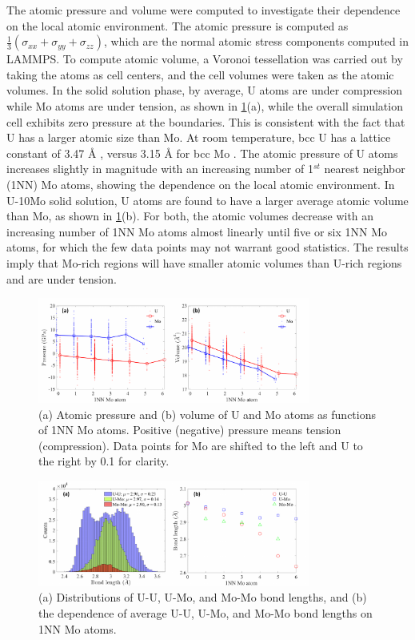 \documentclass[review]{elsarticle}
\providecommand{\DIFaddtex}[1]{{\protect\color{blue} \sf #1}} %
\providecommand{\DIFaddbegin}{} %
\providecommand{\DIFaddFL}[1]{\DIFadd{#1}} %
\providecommand{\DIFadd}[1]{\texorpdfstring{\DIFaddtex{#1}}{#1}} %
\newcommand{\DIFaddincludegraphics}[2][]{{\color{blue}\fbox{\DIFOincludegraphics[#1]{#2}}}} %
\DeclareRobustCommand{\DIFaddbegin}{\DIFOaddbegin \let\includegraphics\DIFaddincludegraphics} %
\begin{document}
\DIFaddbegin \DIFadd{The atomic pressure and volume were computed to investigate their dependence on the local atomic environment. The atomic pressure is computed as $\frac{1}{3}(\sigma_{xx}+\sigma_{yy}+\sigma_{zz})$, which are the normal atomic stress components computed in LAMMPS. To compute atomic volume, a Voronoi tessellation was carried out by taking the atoms as cell centers, and the cell volumes were taken as the atomic volumes. In the solid solution phase, by average, U atoms are under compression while Mo atoms are under tension, as shown in \cref{fig:vol_pressure}(a), while the overall simulation cell exhibits zero pressure at the boundaries. This is consistent with the fact that U has a larger atomic size than Mo. At room temperature, bcc U has a lattice constant of 3.47 }{\DIFadd{\AA}}\DIFadd{, versus 3.15 }{\DIFadd{\AA}} \DIFadd{for bcc Mo \cite{steiner_2016}. The atomic pressure of U atoms increases slightly in magnitude with an increasing number of 1$^{st}$ nearest neighbor (1NN) Mo atoms, showing the dependence on the local atomic environment. In U-10Mo solid solution, U atoms are found to have a larger average atomic volume than Mo, as shown in \cref{fig:vol_pressure}(b). For both, the atomic volumes decrease with an increasing number of 1NN Mo atoms almost linearly until five or six 1NN Mo atoms, for which the few data points may not warrant good statistics. The results imply that Mo-rich regions will have smaller atomic volumes than U-rich regions and are under tension. 
}

\begin{figure}[h!]
 \centering
 \includegraphics[width=0.8\textwidth]{vol_pressure} 
 \caption{\DIFaddFL{(a) Atomic pressure and (b) volume of U and Mo atoms as functions of 1NN Mo atoms. Positive (negative) pressure means tension (compression). Data points for Mo are shifted to the left and U to the right by 0.1 for clarity. }}
 \label{fig:vol_pressure}
\end{figure}

\begin{figure}[h!]
 \centering
 \includegraphics[width=0.8\textwidth]{bond_length} 
 \caption{\DIFaddFL{(a) Distributions of U-U, U-Mo, and Mo-Mo bond lengths, and (b) the dependence of average U-U, U-Mo, and Mo-Mo bond lengths on 1NN Mo atoms.}}
 \label{fig:bond_length}
\end{figure}
\end{document}
